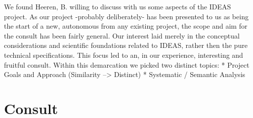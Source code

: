 We found Heeren, B. willing to discuss with us some aspects of the IDEAS project. As 
our project -probably deliberately- has been presented to us as being the 
start of a new, autonomous from any existing project, the scope and aim for
the consult has been fairly general. Our interest laid merely in the 
conceptual considerations and scientific foundations related to IDEAS, 
rather then the pure technical specifications. This focus led to an, in our
experience, interesting and fruitful consult. Within this demarcation we picked
two distinct topics: 
	* Project Goals and Approach (Similarity --> Distinct)
	* Systematic / Semantic Analysis 

\section{Consult}


